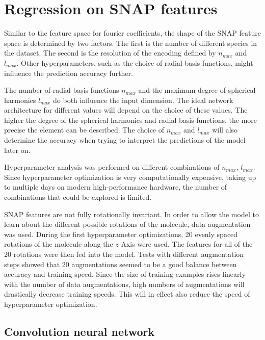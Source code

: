 \newpage
\section{Regression on SNAP features}
\label{sec:Evaluation:snap}

Similar to the feature space for fourier coefficients, the shape of the SNAP feature space is determined by two factors.
The first is the number of different species in the dataset.
The second is the resolution of the encoding defined by $n_{max}$ and $l_{max}$.
Other hyperparameters, such as the choice of radial basis functions, might influence the prediction accuracy further.

The number of radial basis functions $n_{max}$ and the maximum degree of spherical harmonics $l_{max}$ do both influence
the input dimension.
The ideal network architecture for different values will depend on the choice of these values.
The higher the degree of the spherical harmonics and radial basis functions, the more precise the element can be described. %
The choice of $n_{max}$ and $l_{max}$ will also determine the accuracy when trying to interpret the predictions of the model later on.

Hyperparameter analysis was performed on different combinations of $n_{max}$, $l_{max}$.
Since hyperparameter optimization is very computationally expensive, taking up to multiple days on modern high-performance hardware,
the number of combinations that could be explored is limited.

SNAP features are not fully rotationally invariant.
In order to allow the model to learn about the different possible rotations of the molecule, data augmentation was used.
During the first hyperparameter optimizations, 20 evenly spaced rotations of the molecule along the $z$-Axis were used.
The features for all of the 20 rotations were then fed into the model.
Tests with different augmentation steps showed that 20 augmentations seemed to be a good balance between 
accuracy and training speed.
Since the size of training examples rises linearly with the number of data augmentations,
high numbers of augmentations will drastically decrease training speeds.
This will in effect also reduce the speed of hyperparameter optimization.

\subsection{Convolution neural network}

